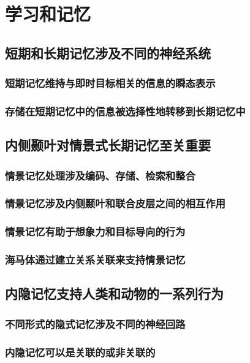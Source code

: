 \chapter{学习和记忆}

\section{短期和长期记忆涉及不同的神经系统}
\subsection{短期记忆维持与即时目标相关的信息的瞬态表示}
\subsection{存储在短期记忆中的信息被选择性地转移到长期记忆中}

\section{内侧颞叶对情景式长期记忆至关重要}
\subsection{情景记忆处理涉及编码、存储、检索和整合}
\subsection{情景记忆涉及内侧颞叶和联合皮层之间的相互作用}
\subsection{情景记忆有助于想象力和目标导向的行为}
\subsection{海马体通过建立关系关联来支持情景记忆}

\section{内隐记忆支持人类和动物的一系列行为}
\subsection{不同形式的隐式记忆涉及不同的神经回路}
\subsection{内隐记忆可以是关联的或非关联的}
